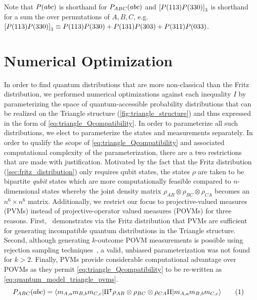 \documentclass[aps, 10pt, english, twoside, pra, nofootinbib, tightenlines, longbibliography, superscriptaddress]{revtex4-1}
\begin{document}
    Note that $\prob\br{abc}$ is shorthand for $\prob[ABC]\br{abc}$ and $\bs{P(113)P(330)}_3$ is shorthand for a sum the over permutations of $A,B,C$, e.g. $\bs{P(113)P(330)}_3 \defined P(113)P(330) + P(131)P(303) + P(311)P(033)$.


    \section{Numerical Optimization}\label{sec:optimizations}

    In order to find quantum distributions that are more non-classical than the Fritz distribution, we performed numerical optimizations against each inequality $I$ by parameterizing the space of quantum-accessible probability distributions that can be realized on the Triangle structure (\cref{fig:triangle_structure}) and thus expressed in the form of \cref{eq:triangle_Qcompatibility}. In order to parameterize all such distributions, we elect to parameterize the states and measurements separately. In order to qualify the scope of \cref{eq:triangle_Qcompatibility} and associated computational complexity of the parameterization, there are a two restrictions that are made with justification. Motivated by the fact that the Fritz distribution (\cref{sec:fritz_distribution}) only requires qubit states, the states $\rho$ are taken to be bipartite \textit{qubit} states which are more computationally feasible compared to $n$-dimensional states whereby the joint density matrix $\rho_{AB}\otimes\rho_{BC}\otimes\rho_{CA}$ becomes an $n^6 \times n^6$ matrix. Additionally, we restrict our focus to projective-valued measures (PVMs) instead of projective-operator valued measures (POVMs) for three reasons. First,~\citet{Fritz_2012} demonstrates via the Fritz distribution that PVMs are sufficient for generating incompatible quantum distributions in the Triangle structure. Second, although generating $k$-outcome POVM measurements is possible using rejection sampling techniques~\cite{Petz_2015}, a valid, unbiased parameterization was not found for $k > 2$. Finally, PVMs provide considerable computational advantage over POVMs as they permit \cref{eq:triangle_Qcompatibility} to be re-written as \cref{eq:quantum_model_triangle_pvms}.
    \[ \prob[ABC]\br{abc} = \bramidket{m_{A,a}m_{B,b}m_{C,c}}{\netperm^\intercal \rho_{AB}\otimes\rho_{BC}\otimes\rho_{CA} \netperm}{m_{A,a}m_{B,b}m_{C,c}} \eq \label{eq:quantum_model_triangle_pvms}\]
\end{document}
